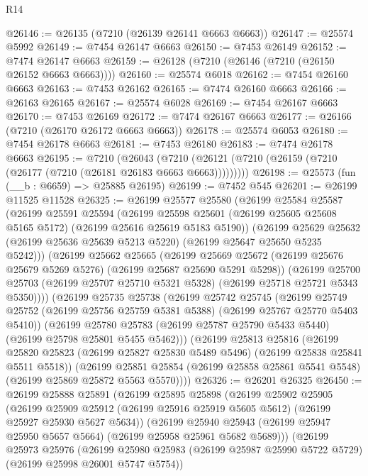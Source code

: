 \begin{lexlean}{R14}
\begin{coremodule}
@26146 := @26135 (@7210 (@26139 @26141 @6663 @6663))
@26147 := @25574 @5992
@26149 := @7454 @26147 @6663
@26150 := @7453 @26149
@26152 := @7474 @26147 @6663
@26159 := @26128 (@7210 (@26146 (@7210 (@26150 @26152 @6663 @6663))))
@26160 := @25574 @6018
@26162 := @7454 @26160 @6663
@26163 := @7453 @26162
@26165 := @7474 @26160 @6663
@26166 := @26163 @26165
@26167 := @25574 @6028
@26169 := @7454 @26167 @6663
@26170 := @7453 @26169
@26172 := @7474 @26167 @6663
@26177 := @26166 (@7210 (@26170 @26172 @6663 @6663))
@26178 := @25574 @6053
@26180 := @7454 @26178 @6663
@26181 := @7453 @26180
@26183 := @7474 @26178 @6663
@26195 := @7210
    (@26043 (@7210 (@26121 (@7210 (@26159 (@7210 (@26177 (@7210 (@26181 @26183 @6663 @6663)))))))))
@26198 := @25573 (fun (__b : @6659) => @25885 @26195)
@26199 := @7452 @545
@26201 := @26199 @11525 @11528
@26325 := @26199
    @25577
    @25580
    (@26199
      @25584
      @25587
      (@26199
        @25591
        @25594
        (@26199 @25598 @25601 (@26199 @25605 @25608 @5165 @5172) (@26199 @25616 @25619 @5183 @5190))
        (@26199
          @25629
          @25632
          (@26199 @25636 @25639 @5213 @5220)
          (@26199 @25647 @25650 @5235 @5242)))
      (@26199
        @25662
        @25665
        (@26199 @25669 @25672 (@26199 @25676 @25679 @5269 @5276) (@26199 @25687 @25690 @5291 @5298))
        (@26199
          @25700
          @25703
          (@26199 @25707 @25710 @5321 @5328)
          (@26199 @25718 @25721 @5343 @5350))))
    (@26199
      @25735
      @25738
      (@26199
        @25742
        @25745
        (@26199 @25749 @25752 (@26199 @25756 @25759 @5381 @5388) (@26199 @25767 @25770 @5403 @5410))
        (@26199
          @25780
          @25783
          (@26199 @25787 @25790 @5433 @5440)
          (@26199 @25798 @25801 @5455 @5462)))
      (@26199
        @25813
        @25816
        (@26199 @25820 @25823 (@26199 @25827 @25830 @5489 @5496) (@26199 @25838 @25841 @5511 @5518))
        (@26199
          @25851
          @25854
          (@26199 @25858 @25861 @5541 @5548)
          (@26199 @25869 @25872 @5563 @5570))))
@26326 := @26201 @26325
@26450 := @26199
    @25888
    @25891
    (@26199
      @25895
      @25898
      (@26199
        @25902
        @25905
        (@26199 @25909 @25912 (@26199 @25916 @25919 @5605 @5612) (@26199 @25927 @25930 @5627 @5634))
        (@26199
          @25940
          @25943
          (@26199 @25947 @25950 @5657 @5664)
          (@26199 @25958 @25961 @5682 @5689)))
      (@26199
        @25973
        @25976
        (@26199 @25980 @25983 (@26199 @25987 @25990 @5722 @5729) (@26199 @25998 @26001 @5747 @5754))

\end{coremodule}
\end{lexlean}
